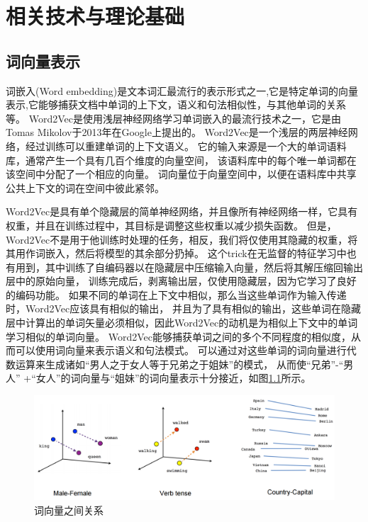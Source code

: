 \chapter{相关技术与理论基础}

\section{词向量表示}

词嵌入(Word embedding)是文本词汇最流行的表示形式之一,它是特定单词的向量表示,它能够捕获文档中单词的上下文，语义和句法相似性，与其他单词的关系等。
Word2Vec是使用浅层神经网络学习单词嵌入的最流行技术之一，它是由Tomas Mikolov于2013年在Google上提出的。
Word2Vec是一个浅层的两层神经网络，经过训练可以重建单词的上下文语义。 它的输入来源是一个大的单词语料库，通常产生一个具有几百个维度的向量空间，
该语料库中的每个唯一单词都在该空间中分配了一个相应的向量。 词向量位于向量空间中，以便在语料库中共享公共上下文的词在空间中彼此紧邻。 

  Word2Vec是具有单个隐藏层的简单神经网络，并且像所有神经网络一样，它具有权重，并且在训练过程中，其目标是调整这些权重以减少损失函数。 
  但是，Word2Vec不是用于他训练时处理的任务，相反，我们将仅使用其隐藏的权重，将其用作词嵌入，然后将模型的其余部分扔掉。
  这个trick在无监督的特征学习中也有用到，其中训练了自编码器以在隐藏层中压缩输入向量，然后将其解压缩回输出层中的原始向量，
  训练完成后，剥离输出层，仅使用隐藏层，因为它学习了良好的编码功能。
  如果不同的单词在上下文中相似，那么当这些单词作为输入传递时，Word2Vec应该具有相似的输出，
  并且为了具有相似的输出，这些单词在隐藏层中计算出的单词矢量必须相似，因此Word2Vec的动机是为相似上下文中的单词学习相似的单词向量。
Word2Vec能够捕获单词之间的多个不同程度的相似度，从而可以使用词向量来表示语义和句法模式。
可以通过对这些单词的词向量进行代数运算来生成诸如“男人之于女人等于兄弟之于姐妹”的模式，
从而使“兄弟”-“男人” +“女人”的词向量与“姐妹”的词向量表示十分接近，如图\ref{fig:linear-relationships}所示。


\begin{figure}[htbp]
  \centering
  \includegraphics[scale=0.5]{./images/linear-relationships.jpg}
  \caption{词向量之间关系}
  \label{fig:linear-relationships}
\end{figure}


